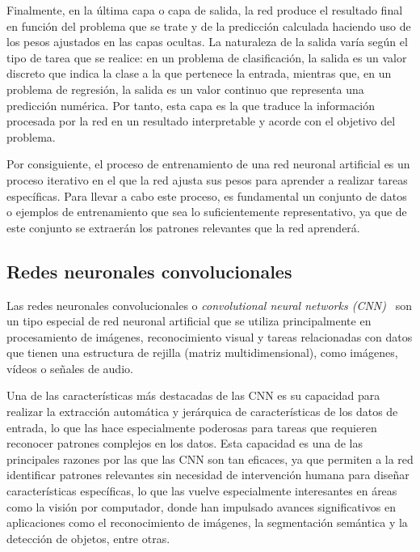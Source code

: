 Finalmente, en la última capa o capa de salida, la red produce el resultado final en función del problema que se trate y de la predicción calculada haciendo uso de los pesos ajustados en las capas ocultas. La naturaleza de la salida varía según el tipo de tarea que se realice: en un problema de clasificación, la salida es un valor discreto que indica la clase a la que pertenece la entrada, mientras que, en un problema de regresión, la salida es un valor continuo que representa una predicción numérica. Por tanto, esta capa es la que traduce la información procesada por la red en un resultado interpretable y acorde con el objetivo del problema.

Por consiguiente, el proceso de entrenamiento de una red neuronal artificial es un proceso iterativo en el que la red ajusta sus pesos para aprender a realizar tareas específicas. Para llevar a cabo este proceso, es fundamental un conjunto de datos o ejemplos de entrenamiento que sea lo suficientemente representativo, ya que de este conjunto se extraerán los patrones relevantes que la red aprenderá.

\subsection{Redes neuronales convolucionales}\label{subsec:redes-neuronales-convolucionales}

Las redes neuronales convolucionales o \emph{convolutional neural networks (CNN)}~\cite{LeCun1989, LeCun1998} son un tipo especial de red neuronal artificial que se utiliza principalmente en procesamiento de imágenes, reconocimiento visual y tareas relacionadas con datos que tienen una estructura de rejilla (matriz multidimensional), como imágenes, vídeos o señales de audio.

Una de las características más destacadas de las CNN es su capacidad para realizar la extracción automática y jerárquica de características de los datos de entrada, lo que las hace especialmente poderosas para tareas que requieren reconocer patrones complejos en los datos. Esta capacidad es una de las principales razones por las que las CNN son tan eficaces, ya que permiten a la red identificar patrones relevantes sin necesidad de intervención humana para diseñar características específicas, lo que las vuelve especialmente interesantes en áreas como la visión por computador, donde han impulsado avances significativos en aplicaciones como el reconocimiento de imágenes, la segmentación semántica y la detección de objetos, entre otras.

